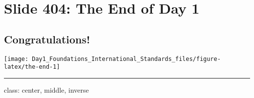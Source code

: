 \documentclass[
]{article}
\begin{document}
\section{Slide 404: The End of Day 1}\label{slide-404-the-end-of-day-1}

\subsection{Congratulations! 🎉}\label{congratulations-1}

\texttt{[image: Day1\_Foundations\_International\_Standards\_files/figure-latex/the-end-1]}

\begin{center}\rule{0.5\linewidth}{0.5pt}\end{center}

class: center, middle, inverse
\end{document}
